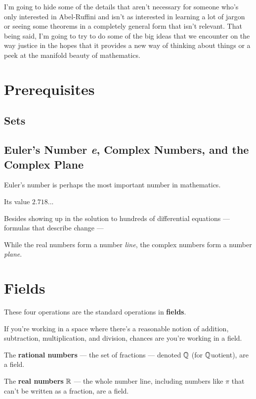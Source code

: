 I'm going to hide some of the details that aren't necessary for someone who's only interested in Abel-Ruffini and isn't as interested in learning a lot of jargon or seeing some theorems in a completely general form that isn't relevant. That being said, I'm going to try to do some of the big ideas that we encounter on the way justice in the hopes that it provides a new way of thinking about things or a peek at the manifold beauty of mathematics.

\section{Prerequisites}

\subsection{Sets}

\subsection{Euler's Number \textit{e}, Complex Numbers, and the Complex Plane}

Euler's number is perhaps the most important number in mathematics.

Its value $2.718...$

Besides showing up in the solution to hundreds of differential equations --- formulas that describe change ---

While the real numbers form a number \textit{line}, the complex numbers form a number \textit{plane}.


\section{Fields}

These four operations are the standard operations in \textbf{fields}.

If you're working in a space where there's a reasonable notion of addition, subtraction, multiplication, and division, chances are you're working in a field.

\begin{example}
    The \textbf{rational numbers} --- the set of fractions --- denoted $\mathbb{Q}$ (for $\mathbb{Q}$uotient), are a field.
\end{example}

\begin{example}
    The \textbf{real numbers} $\mathbb{R}$ --- the whole number line, including numbers like $\pi$ that can't be written as a fraction, are a field.
\end{example}

